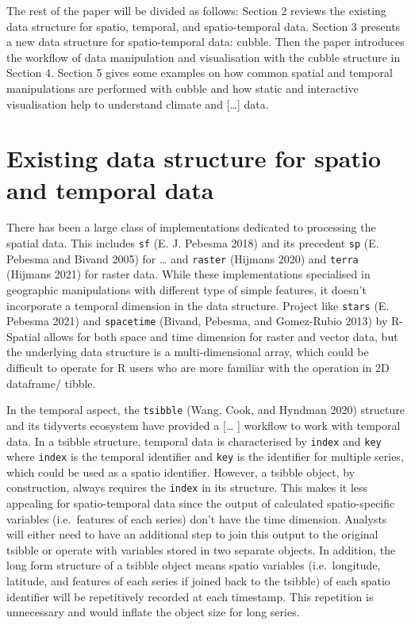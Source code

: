 \documentclass{article}
\begin{document}
The rest of the paper will be divided as follows: Section 2 reviews the
existing data structure for spatio, temporal, and spatio-temporal data.
Section 3 presents a new data structure for spatio-temporal data:
cubble. Then the paper introduces the workflow of data manipulation and
visualisation with the cubble structure in Section 4. Section 5 gives
some examples on how common spatial and temporal manipulations are
performed with cubble and how static and interactive visualisation help
to understand climate and {[}\ldots{]} data.

\hypertarget{existing-data-structure-for-spatio-and-temporal-data}{%
\section{Existing data structure for spatio and temporal
data}\label{existing-data-structure-for-spatio-and-temporal-data}}

There has been a large class of implementations dedicated to processing
the spatial data. This includes \texttt{sf} (E. J. Pebesma 2018) and its
precedent \texttt{sp} (E. Pebesma and Bivand 2005) for \ldots{} and
\texttt{raster} (Hijmans 2020) and \texttt{terra} (Hijmans 2021) for
raster data. While these implementations specialised in geographic
manipulations with different type of simple features, it doesn't
incorporate a temporal dimension in the data structure. Project like
\texttt{stars} (E. Pebesma 2021) and \texttt{spacetime} (Bivand,
Pebesma, and Gomez-Rubio 2013) by R-Spatial allows for both space and
time dimension for raster and vector data, but the underlying data
structure is a multi-dimensional array, which could be difficult to
operate for R users who are more familiar with the operation in 2D
dataframe/ tibble.

In the temporal aspect, the \texttt{tsibble} (Wang, Cook, and Hyndman
2020) structure and its tidyverts ecosystem have provided a {[}\ldots{}
{]} workflow to work with temporal data. In a tsibble structure,
temporal data is characterised by \texttt{index} and \texttt{key} where
\texttt{index} is the temporal identifier and \texttt{key} is the
identifier for multiple series, which could be used as a spatio
identifier. However, a tsibble object, by construction, always requires
the \texttt{index} in its structure. This makes it less appealing for
spatio-temporal data since the output of calculated spatio-specific
variables (i.e.~features of each series) don't have the time dimension.
Analysts will either need to have an additional step to join this output
to the original tsibble or operate with variables stored in two separate
objects. In addition, the long form structure of a tsibble object means
spatio variables (i.e.~longitude, latitude, and features of each series
if joined back to the tsibble) of each spatio identifier will be
repetitively recorded at each timestamp. This repetition is unnecessary
and would inflate the object size for long series.
\end{document}
